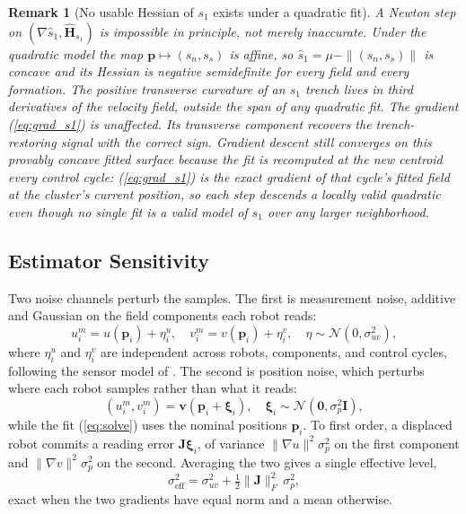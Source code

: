 \documentclass[lettersize,journal]{IEEEtran}
\newtheorem{remark}{Remark}
\begin{document}
\begin{remark}[No usable Hessian of $s_1$ exists under a quadratic fit]
\label{rem:s1hess}
A Newton step on $(\nabla \hat{s}_1,
\hat{\mathbf{H}}_{s_1})$ is impossible in principle, not merely
inaccurate. Under the quadratic model the map $\mathbf{p} \mapsto (s_n,
s_s)$ is affine, so $\hat{s}_1 = \mu - \|(s_n, s_s)\|$ is concave and its
Hessian is negative semidefinite \emph{for every field and every
formation}. The positive transverse curvature of an $s_1$ trench lives
in third derivatives of the velocity field, outside the span of any
quadratic fit. The gradient
(\ref{eq:grad_s1}) is unaffected. Its transverse component recovers the
trench-restoring signal with the correct sign. Gradient descent still
converges on this provably concave fitted surface because the fit is
recomputed at the new centroid every control cycle: (\ref{eq:grad_s1})
is the exact gradient of \emph{that} cycle's fitted field at the
cluster's current position, so each step descends a locally valid
quadratic even though no single fit is a valid model of $s_1$ over any
larger neighborhood.
\end{remark}

\subsection{Estimator Sensitivity}
\label{sec:sensitivity}

Two noise channels perturb the samples. The first is measurement noise,
additive and Gaussian on the field components each robot reads:
\begin{equation}
    u_i^m = u(\mathbf{p}_i) + \eta_i^u, \quad
    v_i^m = v(\mathbf{p}_i) + \eta_i^v,
    \quad \eta \sim \mathcal{N}(0, \sigma_{uv}^2),
    \label{eq:meas_noise}
\end{equation}
where $\eta_i^u$ and $\eta_i^v$ are independent across robots,
components, and control cycles, following the sensor model of \cite{17}.
The second is position noise, which perturbs where each robot samples
rather than what it reads:
\begin{equation}
    (u_i^m, v_i^m) = \mathbf{v}(\mathbf{p}_i + \boldsymbol{\xi}_i), \quad
    \boldsymbol{\xi}_i \sim \mathcal{N}(\mathbf{0}, \sigma_p^2 \mathbf{I}),
    \label{eq:pos_noise}
\end{equation}
while the fit (\ref{eq:solve}) uses the nominal positions
$\mathbf{p}_i$. To first order, a displaced robot commits a reading
error $\mathbf{J}\boldsymbol{\xi}_i$, of variance
$\lVert\nabla u\rVert^2\sigma_p^2$ on the first component and
$\lVert\nabla v\rVert^2\sigma_p^2$ on the second. Averaging the two gives
a single effective level,
\begin{equation}
    \sigma_{\mathrm{eff}}^2 = \sigma_{uv}^2
        + \tfrac{1}{2}\lVert\mathbf{J}\rVert_F^2\,\sigma_p^2 ,
    \label{eq:sigma_eff}
\end{equation}
exact when the two gradients have equal norm and a mean otherwise.
\end{document}
